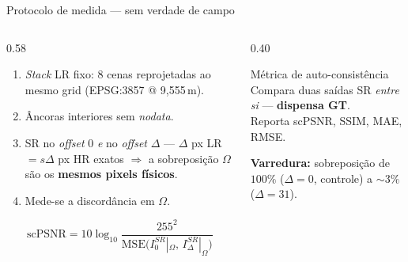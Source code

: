 \documentclass[aspectratio=169]{beamer}
\begin{document}
\begin{frame}{Protocolo de medida --- sem verdade de campo}

  \begin{columns}[T]
    \begin{column}{0.58\textwidth}
      \begin{enumerate}
        \item \textit{Stack} LR fixo: 8 cenas reprojetadas ao mesmo grid
              (EPSG:3857 @ 9{,}555\,m).
        \item Âncoras interiores sem \textit{nodata}.
        \item SR no \textit{offset} $0$ \emph{e} no \textit{offset} $\Delta$ ---
              $\Delta$ px LR $=s\Delta$ px HR exatos $\Rightarrow$ a sobreposição
              $\Omega$ são os \textbf{mesmos pixels físicos}.
        \item Mede-se a discordância em $\Omega$.
      \end{enumerate}
      \vspace{0.3em}
      \[
        \text{scPSNR} = 10\log_{10}\frac{255^2}{\mathrm{MSE}\big(I^{SR}_0|_\Omega,\,I^{SR}_\Delta|_\Omega\big)}
      \]
    \end{column}
    \begin{column}{0.40\textwidth}
      \begin{block}{Métrica de auto-consistência}
        Compara duas saídas SR \emph{entre si} --- \textbf{dispensa GT}.\\[0.3em]
        Reporta scPSNR, SSIM, MAE, RMSE.
      \end{block}
      \vspace{0.3em}
      \textbf{Varredura:} sobreposição de $100\%$ ($\Delta=0$, controle) a
      $\sim$$3\%$ ($\Delta=31$).
    \end{column}
  \end{columns}

\end{frame}
\end{document}
